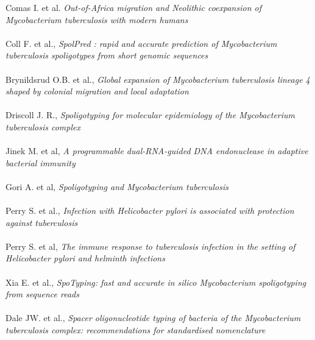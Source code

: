 \documentclass[twoside,a4paper,11pt,frenchb,openany]{report}
\begin{document}

\renewcommand{\bibname}{Références}
\begin{thebibliography}{10}
Comas I. et al. \textit{Out-of-Africa migration and Neolithic coexpansion of Mycobacterium tuberculosis with modern humans}\\ \\

Coll F. et al., \textit{SpolPred : rapid and accurate prediction of Mycobacterium tuberculosis spoligotypes from short genomic sequences}\\ \\

Brynildsrud O.B. et al., \textit{Global expansion of Mycobacterium tuberculosis lineage 4 shaped by colonial migration and local adaptation}\\ \\

Driscoll J. R., \textit{Spoligotyping for molecular epidemiology of the Mycobacterium tuberculosis complex}\\ \\

Jinek M. et al, \textit{A programmable dual-RNA-guided DNA endonuclease in adaptive bacterial immunity}\\ \\

Gori A. et al, \textit{Spoligotyping and Mycobacterium tuberculosis}\\ \\

Perry S. et al., \textit{Infection with Helicobacter pylori is associated with protection against tuberculosis}\\ \\

Perry S. et al, \textit{The immune response to tuberculosis infection in the setting of Helicobacter pylori and helminth infections}\\ \\

Xia E. et al., \textit{SpoTyping: fast and accurate in silico Mycobacterium spoligotyping from sequence reads}\\ \\ 

Dale JW. et al., \textit{Spacer oligonucleotide typing of bacteria of the Mycobacterium tuberculosis complex: recommendations for standardised nomenclature}\\ \\



\end{thebibliography}
\end{document}
